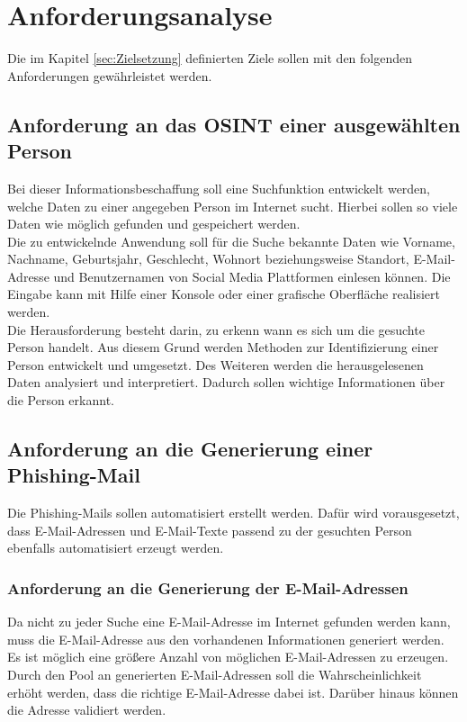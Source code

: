 
\chapter{Anforderungsanalyse}  %
\label{cha:Anforderungsanalyse} %
Die im Kapitel \ref{sec:Zielsetzung} definierten Ziele sollen mit den folgenden Anforderungen gewährleistet werden.

\section{Anforderung an das OSINT einer ausgewählten Person}
Bei dieser Informationsbeschaffung soll eine Suchfunktion entwickelt werden, welche Daten zu einer angegeben Person im Internet sucht. Hierbei sollen so viele Daten wie möglich gefunden und gespeichert werden.\\
Die zu entwickelnde Anwendung soll für die Suche bekannte Daten wie Vorname, Nachname, Geburtsjahr, Geschlecht, Wohnort beziehungsweise Standort, E-Mail-Adresse und Benutzernamen von Social Media Plattformen einlesen können. Die Eingabe kann mit Hilfe einer Konsole oder einer grafische Oberfläche realisiert werden.\\
Die Herausforderung besteht darin, zu erkenn wann es sich um die gesuchte Person handelt. Aus diesem Grund werden Methoden zur Identifizierung einer Person entwickelt und umgesetzt. Des Weiteren werden die herausgelesenen Daten analysiert und interpretiert. Dadurch sollen wichtige Informationen über die Person erkannt.

\section{Anforderung an die Generierung einer Phishing-Mail}
Die Phishing-Mails sollen automatisiert erstellt werden. Dafür wird vorausgesetzt, dass E-Mail-Adressen und E-Mail-Texte passend zu der gesuchten Person ebenfalls automatisiert erzeugt werden.
	\subsection{Anforderung an die Generierung der E-Mail-Adressen}
	Da nicht zu jeder Suche eine E-Mail-Adresse im Internet gefunden werden kann, muss die E-Mail-Adresse aus den vorhandenen Informationen generiert werden. Es ist möglich eine größere Anzahl von möglichen E-Mail-Adressen zu erzeugen. Durch den Pool an generierten E-Mail-Adressen soll die Wahrscheinlichkeit erhöht werden, dass die richtige E-Mail-Adresse dabei ist. Darüber hinaus können die Adresse validiert werden.
